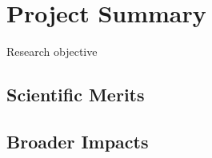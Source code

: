 \section{Project Summary}

Research objective

\subsection{Scientific Merits}

\subsection{Broader Impacts}
  
  
  